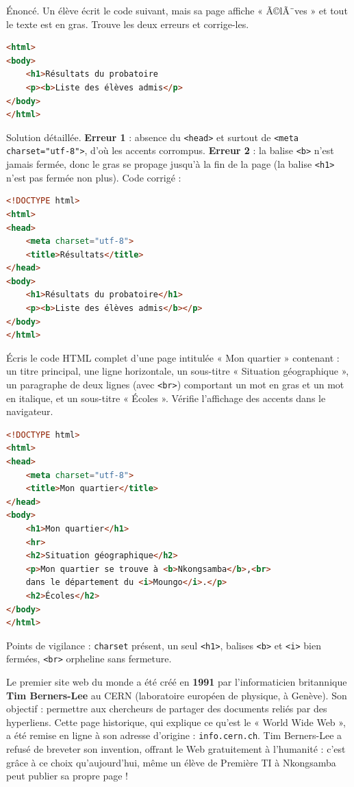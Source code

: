 \documentclass[11pt]{article}
\begin{document}
\begin{exoresolu}
Énoncé. Un élève écrit le code suivant, mais sa page affiche « Ã©lÃ¨ves » et tout le texte est en gras. Trouve les deux erreurs et corrige-les.
\begin{lstlisting}[language=HTML]
<html>
<body>
    <h1>Résultats du probatoire
    <p><b>Liste des élèves admis</p>
</body>
</html>
\end{lstlisting}
\tcblower
Solution détaillée. \textbf{Erreur 1} : absence du \texttt{<head>} et surtout de \texttt{<meta charset="utf-8">}, d'où les accents corrompus. \textbf{Erreur 2} : la balise \texttt{<b>} n'est jamais fermée, donc le gras se propage jusqu'à la fin de la page (la balise \texttt{<h1>} n'est pas fermée non plus). Code corrigé :
\begin{lstlisting}[language=HTML]
<!DOCTYPE html>
<html>
<head>
    <meta charset="utf-8">
    <title>Résultats</title>
</head>
<body>
    <h1>Résultats du probatoire</h1>
    <p><b>Liste des élèves admis</b></p>
</body>
</html>
\end{lstlisting}
\end{exoresolu}

\begin{exercice}
Écris le code HTML complet d'une page intitulée « Mon quartier » contenant : un titre principal, une ligne horizontale, un sous-titre « Situation géographique », un paragraphe de deux lignes (avec \texttt{<br>}) comportant un mot en gras et un mot en italique, et un sous-titre « Écoles ». Vérifie l'affichage des accents dans le navigateur.
\end{exercice}

\begin{corrige}[Exercice 1]
\begin{lstlisting}[language=HTML]
<!DOCTYPE html>
<html>
<head>
    <meta charset="utf-8">
    <title>Mon quartier</title>
</head>
<body>
    <h1>Mon quartier</h1>
    <hr>
    <h2>Situation géographique</h2>
    <p>Mon quartier se trouve à <b>Nkongsamba</b>,<br>
    dans le département du <i>Moungo</i>.</p>
    <h2>Écoles</h2>
</body>
</html>
\end{lstlisting}
Points de vigilance : \texttt{charset} présent, un seul \texttt{<h1>}, balises \texttt{<b>} et \texttt{<i>} bien fermées, \texttt{<br>} orpheline sans fermeture.
\end{corrige}

\begin{savaistu}
Le premier site web du monde a été créé en \textbf{1991} par l'informaticien britannique \textbf{Tim Berners-Lee} au CERN (laboratoire européen de physique, à Genève). Son objectif : permettre aux chercheurs de partager des documents reliés par des hyperliens. Cette page historique, qui explique ce qu'est le « World Wide Web », a été remise en ligne à son adresse d'origine : \texttt{info.cern.ch}. Tim Berners-Lee a refusé de breveter son invention, offrant le Web gratuitement à l'humanité : c'est grâce à ce choix qu'aujourd'hui, même un élève de Première TI à Nkongsamba peut publier sa propre page !
\end{savaistu}
\end{document}
